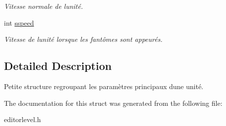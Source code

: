 \begin{DoxyCompactItemize}
\begin{DoxyCompactList}\small\item\em Vitesse normale de l\textquotesingle{}unité. \end{DoxyCompactList}\item 
\hypertarget{struct_unit_data__str_a328dbd260b3684372a61ff434347796f}{}int \hyperlink{struct_unit_data__str_a328dbd260b3684372a61ff434347796f}{sspeed}\label{struct_unit_data__str_a328dbd260b3684372a61ff434347796f}

\begin{DoxyCompactList}\small\item\em Vitesse de l\textquotesingle{}unité lorsque les fantômes sont appeurés. \end{DoxyCompactList}\end{DoxyCompactItemize}


\subsection{Detailed Description}
Petite structure regroupant les paramètres principaux d\textquotesingle{}une unité. 

The documentation for this struct was generated from the following file\+:\begin{DoxyCompactItemize}
\item 
editorlevel.\+h\end{DoxyCompactItemize}
